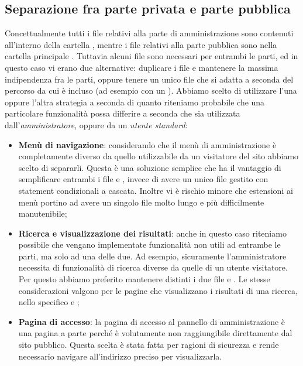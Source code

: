 \documentclass[12pt]{article}
\begin{document}
	\subsection{Separazione fra parte privata e parte pubblica}
	Concettualmente tutti i file relativi alla parte di amministrazione sono contenuti all'interno della cartella , mentre i file relativi alla parte pubblica sono nella cartella principale . 
	Tuttavia alcuni file sono necessari per entrambi le parti, ed in questo caso vi erano due alternative: duplicare i file e mantenere la massima indipendenza fra le parti, oppure tenere un unico file che si adatta a seconda del percorso da cui è incluso (ad esempio con un ). Abbiamo scelto di utilizzare l'una oppure l'altra strategia a seconda di quanto riteniamo probabile che una particolare funzionalità possa differire a seconda che sia utilizzata dall'\textit{amministratore}, oppure da un \textit{utente standard}: 
	\begin{itemize}
		\item \textbf{Menù di navigazione}: considerando che il menù di amministrazione è completamente diverso da quello utilizzabile da un visitatore del sito abbiamo scelto di separarli. Questa è una soluzione semplice che ha il vantaggio di semplificare entrambi i file  e , invece di avere un unico file gestito con statement condizionali a cascata. Inoltre vi è rischio minore che estensioni ai menù portino ad avere un singolo file molto lungo e più difficilmente manutenibile;
		\item \textbf{Ricerca e visualizzazione dei risultati}: anche in questo caso riteniamo possibile che vengano implementate funzionalità non utili ad entrambe le parti, ma solo ad una delle due. Ad esempio, sicuramente l'amministratore necessita di funzionalità di ricerca diverse da quelle di un utente visitatore. Per questo abbiamo preferito mantenere distinti i due file  e . Le stesse considerazioni valgono per le pagine che visualizzano i risultati di una ricerca, nello specifico  e ;
		\item \textbf{Pagina di accesso}: la pagina di accesso al pannello di amministrazione è una pagina a parte perché è volutamente non raggiungibile direttamente dal sito pubblico. Questa scelta è stata fatta per ragioni di sicurezza e rende necessario navigare all'indirizzo preciso per visualizzarla.
	\end{itemize}
\end{document}
